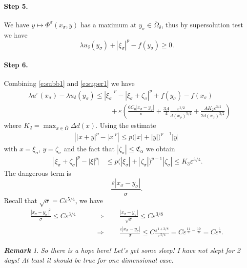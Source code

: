 \documentclass[11pt,reqno]{amsart}
\numberwithin{figure}{section}
\theoremstyle{plain}
\theoremstyle{remark}
\newtheorem{rem}{\bf{Remark}}
\numberwithin{equation}{section}
\begin{document}
\paragraph{Step 5.} We have $y\mapsto \Phi^\sigma(x_\sigma,y)$ has a maximum at $y_\sigma\in \overline{\Omega}_\delta$, thus by supersolution test we have 
\begin{equation}\label{e:super1}
    \lambda u_\delta(y_\sigma) + \left|\xi_\sigma\right|^p - f(y_\sigma) \geq 0.
\end{equation}

\paragraph{Step 6.} Combining \eqref{e:subb1} and \eqref{e:super1} we have
\begin{align}
    &\lambda u^\varepsilon(x_\sigma) - \lambda u_\delta(y_\sigma) \leq |\xi_\sigma|^p - |\xi_\sigma+\zeta_\sigma|^p + f(y_\sigma) - f(x_\sigma) \nonumber \\
    & \qquad\qquad\qquad\qquad\qquad\qquad + \varepsilon \left(\frac{6C_0|x_\sigma - y_\sigma|}{\sigma} + \frac{3A}{4}\frac{\varepsilon^{3/2}}{d(x_\sigma)^{5/2}} + \frac{AK_2\varepsilon^{3/2}}{2d(x_\sigma)^{3/2}}\right) 
\end{align}
where $K_2 = \max_{x\in \overline{\Omega}}\Delta d(x)$. Using the estimate
\begin{align*}
    \left||x+y|^p - |x|^p \right| \leq  p\big(|x|+|y|\big)^{p-1}|y|
\end{align*}
with $x = \xi_\sigma$, $y = \zeta_\sigma$ and the fact that $|\zeta_\sigma|\leq \mathfrak{C}_\alpha$ we obtain
\begin{align}
    \Big||\xi_\sigma+\zeta_\sigma|^p - |\xi|^p\Big| &\leq p\Big(|\xi_\sigma|+|\zeta_\sigma|\Big)^{p-1}|\zeta_\sigma| \leq K_3\varepsilon ^{5/4}.\label{e:est2}
\end{align}
The dangerous term is
\begin{equation*}
    \frac{\varepsilon|x_\sigma - y_\sigma|}{\sigma}.
\end{equation*}
Recall that $\sqrt{\sigma} = C\varepsilon^{5/4}$, we have
\begin{align*}
    \frac{|x_\sigma-y_\sigma|^2}{\sigma} \leq C\varepsilon^{3/4} &\qquad\Longrightarrow\qquad \frac{|x_\sigma-y_\sigma|}{\sqrt{\sigma}} \leq C\varepsilon^{3/8}\\
    &\qquad\Longrightarrow\qquad \frac{\varepsilon|x_\sigma-y_\sigma|}{\sigma} \leq C\frac{\varepsilon^{1+3/8}}{\varepsilon^{5/4}} = C\varepsilon^{\frac{11}{8} - \frac{10}{8}} = C\varepsilon^{\frac{1}{8}}.
\end{align*}
\begin{rem} \emph{So there is a hope here! Let's get some sleep! I have not slept for 2 days! At least it should be true for one dimensional case.}
\end{rem}

{}
%

\end{document}
